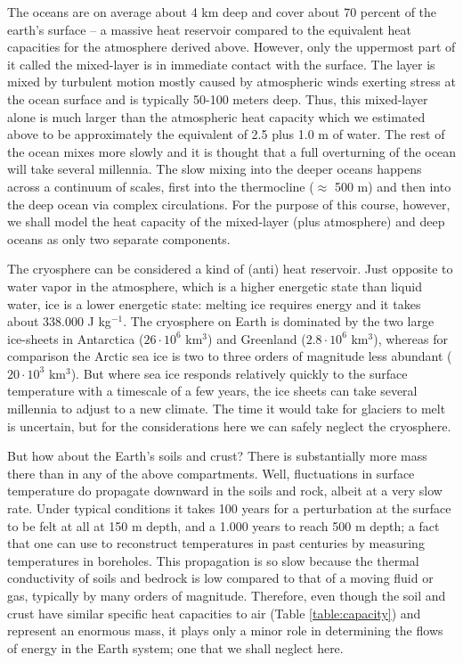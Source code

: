 \documentclass[12pt]{book}
\begin{document}
The oceans are on average about 4 km deep and cover about 70 percent of the earth's surface -- a massive heat reservoir compared to the equivalent heat capacities for the atmosphere derived above. However, only the uppermost part of it called the mixed-layer is in immediate contact with the surface. The layer is mixed by turbulent motion mostly caused by atmospheric winds exerting stress at the ocean surface and is typically 50-100 meters deep. Thus, this mixed-layer alone is much larger than the atmospheric heat capacity which we estimated above to be approximately the equivalent of 2.5 plus 1.0 m of water. The rest of the ocean mixes more slowly and it is thought that a full overturning of the ocean will take several millennia. The slow mixing into the deeper oceans happens across a continuum of scales, first into the thermocline ($\approx$ 500 m) and then into the deep ocean via complex circulations. For the purpose of this course, however, we shall model the heat capacity of the mixed-layer (plus atmosphere) and deep oceans as only two separate components. 

The cryosphere can be considered a kind of (anti) heat reservoir. Just opposite to water vapor in the atmosphere, which is a higher energetic state than liquid water, ice is a lower energetic state: melting ice requires energy and it takes about 338.000 J kg$^{-1}$. The cryosphere on Earth is dominated by the two large ice-sheets in Antarctica ($26\cdot10^6$ km$^3$) and Greenland ($2.8\cdot10^6$ km$^3$), whereas for comparison the Arctic sea ice is two to three orders of magnitude less abundant ($20\cdot10^3$ km$^3$). But where sea ice responds relatively quickly to the surface temperature with a timescale of a few years, the ice sheets can take several millennia to adjust to a new climate. The time it would take for glaciers to melt is uncertain, but for the considerations here we can safely neglect the cryosphere.

But how about the Earth's soils and crust? There is substantially more mass there than in any of the above compartments. Well, fluctuations in surface temperature do propagate downward in the soils and rock, albeit at a very slow rate. Under typical conditions it takes 100 years for a perturbation at the surface to be felt at all at 150 m depth, and a 1.000 years to reach 500 m depth; a fact that one can use to reconstruct temperatures in past centuries by measuring temperatures in boreholes. This propagation is so slow because the thermal conductivity of soils and bedrock is low compared to that of a moving fluid or gas, typically by many orders of magnitude. Therefore, even though the soil and crust have similar specific heat capacities to air (Table \ref{table:capacity}) and represent an enormous mass, it plays only a minor role in determining the flows of energy in the Earth system; one that we shall neglect here.
\end{document}

